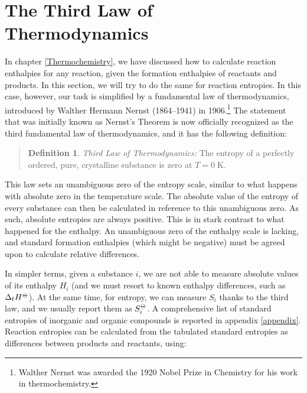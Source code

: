 \documentclass[
  9pt,
]{extbook}
\theoremstyle{definition}
\newtheorem{definition}{Definition}[chapter]
\theoremstyle{definition}
\theoremstyle{definition}
\theoremstyle{definition}
\theoremstyle{remark}
\begin{document}
\section{The Third Law of Thermodynamics}\label{thirdlawsect}

In chapter \ref{Thermochemistry}, we have discussed how to calculate reaction enthalpies for any reaction, given the formation enthalpies of reactants and products. In this section, we will try to do the same for reaction entropies. In this case, however, our task is simplified by a fundamental law of thermodynamics, introduced by Walther Hermann Nernst (1864--1941) in 1906.\footnote{Walther Nernst was awarded the 1920 Nobel Prize in Chemistry for his work in thermochemistry.} The statement that was initially known as Nernst's Theorem is now officially recognized as the third fundamental law of thermodynamics, and it has the following definition:

\begin{quote}
\begin{definition}
\protect\hypertarget{def:thirdlawdef}{}\label{def:thirdlawdef}\emph{Third Law of Thermodynamics:} The entropy of a perfectly ordered, pure, crystalline substance is zero at \(T=0 \; \text{K}\).
\end{definition}
\end{quote}

This law sets an unambiguous zero of the entropy scale, similar to what happens with absolute zero in the temperature scale. The absolute value of the entropy of every substance can then be calculated in reference to this unambiguous zero. As such, absolute entropies are always positive. This is in stark contrast to what happened for the enthalpy. An unambiguous zero of the enthalpy scale is lacking, and standard formation enthalpies (which might be negative) must be agreed upon to calculate relative differences.

In simpler terms, given a substance \(i\), we are not able to measure absolute values of its enthalpy \(H_i\) (and we must resort to known enthalpy differences, such as \(\Delta_{\mathrm{f}} H^{-\kern-6pt{\ominus}\kern-6pt-}\)). At the same time, for entropy, we can measure \(S_i\) thanks to the third law, and we usually report them as \(S_i^{-\kern-6pt{\ominus}\kern-6pt-}\). A comprehensive list of standard entropies of inorganic and organic compounds is reported in appendix \ref{appendix}. Reaction entropies can be calculated from the tabulated standard entropies as differences between products and reactants, using:
\end{document}
